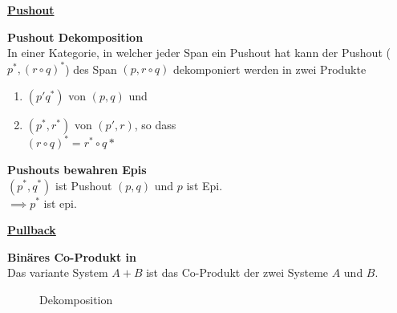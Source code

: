 \begin{multicols}{2}

\textbf{\underline{Pushout}} 

\textbf{ Pushout Dekomposition} \\
In einer Kategorie, in welcher jeder Span ein Pushout hat kann der Pushout ($p^*, (r \circ q)^*$) des Span $(p, r \circ q)$ dekomponiert werden in zwei Produkte 
\begin{enumerate}
\item $(p' q^*)$ von $(p,q)$ und 
\item $(p^*, r^*)$ von $(p', r)$, so dass \\ $(r \circ q)^* = r^* \circ q*$
\end{enumerate}

\textbf{ Pushouts bewahren Epis} \\
$(p^*, q^*)$ ist Pushout $(p,q)$ und $p$ ist Epi.\\
$\implies p^*$ ist epi.


\columnbreak

\textbf{\underline{Pullback}} 

\textbf{ Binäres Co-Produkt in \syssig} \\
Das variante System $A + B$ ist das Co-Produkt der zwei Systeme $A$ und $B$.

\end{multicols}

\begin{figure}[h]
\centering
{} \qquad \qquad \qquad
{}
\caption{Dekomposition}
\end{figure}

